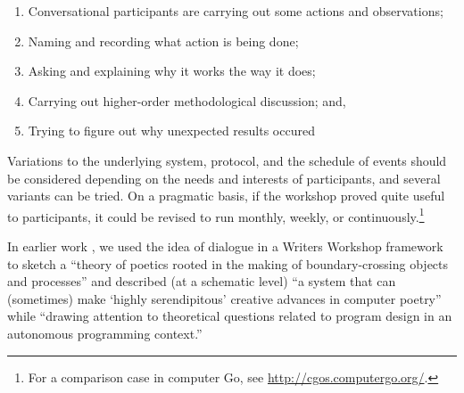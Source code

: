 \begin{center}
\begin{fminipage}{.8\columnwidth}
\begin{minipage}{1\textwidth}
\begin{enumerate}[itemsep=0pt,rightmargin=10pt]
\item Conversational participants are carrying
out some actions and observations;
\item Naming and recording what action is being done;
\item Asking and explaining why it works the way
it does;
\item Carrying out higher-order methodological discussion; and, 
\item Trying to figure out why unexpected results occured
\end{enumerate}
\end{minipage}
\end{fminipage}
\end{center}

Variations to the underlying system, protocol, and the schedule of
events should be considered depending on the needs and interests of
participants, and several variants can be tried.  On a pragmatic
basis, if the workshop proved quite useful to participants, it could
be revised to run monthly, weekly, or continuously.\footnote{For a
  comparison case in computer Go, see
  \url{http://cgos.computergo.org/}.}


In earlier work \cite{corneli15cc,corneli15iccc}, we used the idea of
dialogue in a Writers Workshop framework to sketch a ``theory of
poetics rooted in the making of boundary-crossing objects and
processes'' and described (at a schematic level) ``a system that can
(sometimes) make `highly serendipitous' creative advances in computer
poetry'' while ``drawing attention to theoretical questions related to
program design in an autonomous programming context.''




